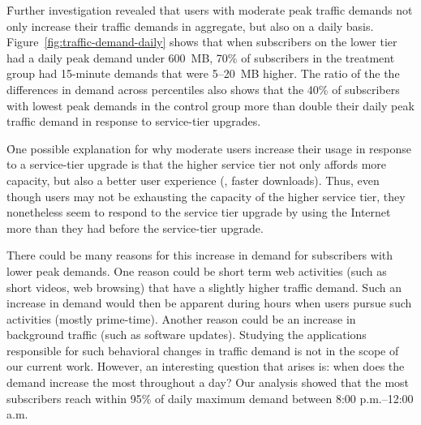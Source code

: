 \f{Further investigation revealed that users with moderate peak traffic
  demands not only increase their traffic demands in aggregate, but also
  on a daily basis.}  Figure~\ref{fig:traffic-demand-daily} shows that
when subscribers on the lower tier had a daily peak demand under 600~MB,
70\% of subscribers in the treatment group had 15-minute demands that
were 5--20~MB higher.  The ratio of the the differences in demand across
percentiles also shows that the 40\% of subscribers with lowest peak
demands in the control group more than
double their daily peak traffic demand in response to service-tier upgrades.

\f{One possible explanation for why moderate users increase their usage
  in response to a service-tier upgrade is that the higher service tier
  not only affords more capacity, but also a better user experience
  (\eg, faster downloads).  Thus, even though users may not be
  exhausting the capacity of the higher service tier, they nonetheless
  seem to respond to the service tier upgrade by using the Internet more
  than they had before the service-tier upgrade.}


There could be many reasons for this increase in demand for subscribers with
lower peak demands. One reason could be short term web activities (such as short videos,
web browsing) that have a slightly higher traffic demand. Such an increase in demand would
then be apparent during hours when users pursue such activities (mostly prime-time).
Another reason could be an increase in background traffic (such as software updates).
Studying the applications responsible for such behavioral changes in traffic demand is not
in the scope of our current work. However, an interesting question that arises is: when
does the demand increase the most throughout a day? Our analysis showed that the most
subscribers reach within 95\% of daily maximum demand between 8:00 p.m.--12:00 a.m.
\fi

